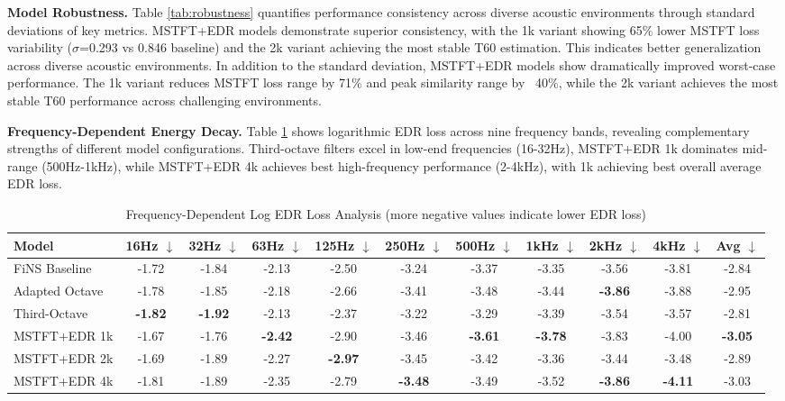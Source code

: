 \documentclass[conference]{IEEEtran}
\begin{document}
\textbf{Model Robustness.} Table \ref{tab:robustness} quantifies performance consistency across diverse acoustic environments through standard deviations of key metrics. MSTFT+EDR models demonstrate superior consistency, with the 1k variant showing 65\% lower MSTFT loss variability ($\sigma$=0.293 vs 0.846 baseline) and the 2k variant achieving the most stable T60 estimation. This indicates better generalization across diverse acoustic environments. In addition to the standard deviation, MSTFT+EDR models show dramatically improved worst-case performance. The 1k variant reduces MSTFT loss range by 71\% and peak similarity range by ~40\%, while the 2k variant achieves the most stable T60 performance across challenging environments.
 
\textbf{Frequency-Dependent Energy Decay.} Table \ref{tab:edr_frequency} shows logarithmic EDR loss across nine frequency bands, revealing complementary strengths of different model configurations. Third-octave filters excel in low-end frequencies (16-32Hz), MSTFT+EDR 1k dominates mid-range (500Hz-1kHz), while MSTFT+EDR 4k achieves best high-frequency performance (2-4kHz), with 1k achieving best overall average EDR loss.

 
\begin{table}[!t]
\centering
\caption{Frequency-Dependent Log EDR Loss Analysis (more negative values indicate lower EDR loss)}
\vspace{-0.2cm}
\label{tab:edr_frequency}
\footnotesize
\begin{tabular}{|l|c|c|c|c|c|c|c|c|c|c|}
\hline
\textbf{Model} & \textbf{16Hz $\downarrow$} & \textbf{32Hz $\downarrow$} & \textbf{63Hz $\downarrow$} & \textbf{125Hz $\downarrow$} & \textbf{250Hz $\downarrow$} & \textbf{500Hz $\downarrow$} & \textbf{1kHz $\downarrow$} & \textbf{2kHz $\downarrow$} & \textbf{4kHz $\downarrow$} & \textbf{Avg $\downarrow$} \\
\hline
FiNS Baseline & -1.72 & -1.84 & -2.13 & -2.50 & -3.24 & -3.37 & -3.35 & -3.56 & -3.81 & -2.84 \\
Adapted Octave & -1.78 & -1.85 & -2.18 & -2.66 & -3.41 & -3.48 & -3.44 & \textbf{-3.86} & -3.88 & -2.95 \\
Third-Octave & \textbf{-1.82} & \textbf{-1.92} & -2.13 & -2.37 & -3.22 & -3.29 & -3.39 & -3.54 & -3.57 & -2.81 \\
MSTFT+EDR 1k & -1.67 & -1.76 & \textbf{-2.42} & -2.90 & -3.46 & \textbf{-3.61} & \textbf{-3.78} & -3.83 & -4.00 & \textbf{-3.05} \\
MSTFT+EDR 2k & -1.69 & -1.89 & -2.27 & \textbf{-2.97} & -3.45 & -3.42 & -3.36 & -3.44 & -3.48 & -2.89 \\
MSTFT+EDR 4k & -1.81 & -1.89 & -2.35 & -2.79 & \textbf{-3.48} & -3.49 & -3.52 & \textbf{-3.86} & \textbf{-4.11} & -3.03 \\
\hline
\end{tabular}
\vspace{-0.1cm}
\end{table}
 
\end{document}
